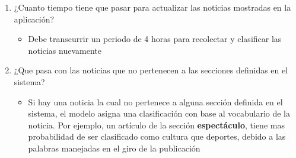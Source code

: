 \begin{enumerate}
	\item ¿Cuanto tiempo tiene que pasar para actualizar las noticias mostradas en la aplicación?
	\begin{itemize}	
		\item Debe transcurrir un periodo de 4 horas para recolectar y clasificar las noticias nuevamente
	\end{itemize}
	
	\item ¿Que pasa con las noticias que no pertenecen a las secciones definidas en el sistema?
	\begin{itemize}	
		\item Si hay una noticia la cual no pertenece a alguna sección definida en el sistema, el modelo asigna una clasificación con base al vocabulario de la noticia. Por ejemplo, un artículo de la sección \textbf{espectáculo}, tiene mas probabilidad de ser clasificado como cultura que deportes, debido a las palabras manejadas en el giro de la publicación
	\end{itemize}

\end{enumerate}

	


